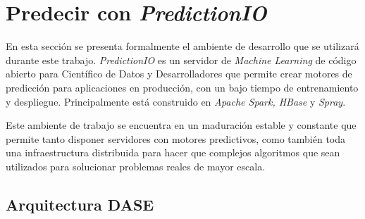 \section{Predecir con \emph{PredictionIO}}

  	
En esta sección se presenta formalmente el ambiente de desarrollo que se utilizará durante este trabajo. \emph{PredictionIO} es un servidor de \emph{Machine Learning} de código abierto para Científico de Datos y Desarrolladores que permite crear motores de predicción para aplicaciones en producción, con un bajo tiempo de entrenamiento y despliegue. Principalmente está construido en \emph{Apache Spark, HBase} y \emph{Spray}. 

Este ambiente de trabajo se encuentra en un maduración estable y constante que permite tanto disponer servidores con motores predictivos, como también toda una infraestructura distribuida para hacer que complejos algoritmos que sean utilizados para solucionar problemas reales de mayor escala.














 
 



\subsection{Arquitectura DASE}


